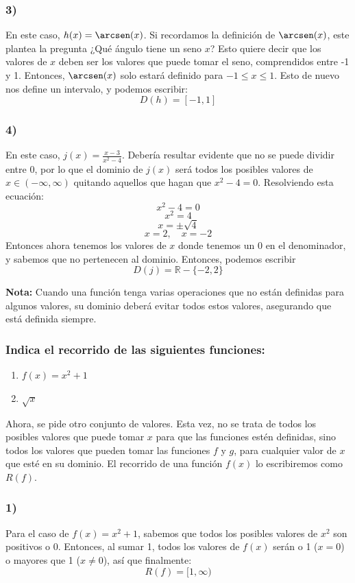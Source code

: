 \documentclass[sans]{apuntes}
\begin{document}
\begin{examplebox}
	\subsubsection*{3)}
	En este caso, $h(x) = \arcsen(x)$. Si recordamos la definición de $\arcsen(x)$, este plantea la pregunta ¿Qué ángulo tiene un seno $x$? Esto quiere decir que los valores de $x$ deben ser los valores que puede tomar el seno, comprendidos entre -1 y 1. Entonces, $\arcsen(x)$ solo estará definido para $-1 \leq x \leq 1$. Esto de nuevo nos define un intervalo, y podemos escribir:
	\[D(h) = [-1, 1]\]

	\subsubsection*{4)}
	En este caso, $j(x) =\frac{x - 3}{x^2 - 4}$. Debería resultar evidente que no se puede dividir entre 0, por lo que el dominio de $j(x)$ será todos los posibles valores de $x \in (-\infty, \infty)$ quitando aquellos que hagan que $x^2 - 4 = 0$. Resolviendo esta ecuación:
	\[x^2 - 4 = 0\]
	\[x^2 = 4\]
	\[x = \pm \sqrt{4}\]
	\[x = 2,\quad x = -2\]
	Entonces ahora tenemos los valores de $x$ donde tenemos un 0 en el denominador, y sabemos que no pertenecen al dominio. Entonces, podemos escribir
	\[D(j) = \mathbb{R} - \{-2, 2\} \]

	\textbf{Nota:} Cuando una función tenga varias operaciones que no están definidas para algunos valores, su dominio deberá evitar todos estos valores, asegurando que está definida siempre.

	\subsubsection*{Indica el recorrido de las siguientes funciones:}
	\begin{enumerate}
		\item $f(x) = x^2 + 1$
		\item $\sqrt{x}$
	\end{enumerate}
	Ahora, se pide otro conjunto de valores. Esta vez, no se trata de todos los posibles valores que puede tomar $x$ para que las funciones estén definidas, sino todos los valores que pueden tomar las funciones $f$ y $g$, para cualquier valor de $x$ que esté en su dominio. El recorrido de una función $f(x)$ lo escribiremos como $R(f)$.

	\subsubsection*{1)}
	Para el caso de $f(x) = x^2 + 1$, sabemos que todos los posibles valores de $x^2$ son positivos o 0. Entonces, al sumar 1, todos los valores de $f(x)$ serán o 1 ($x = 0$) o mayores que 1 ($x \neq 0$), así que finalmente:
	\[ R(f) = [1, \infty) \]


\end{examplebox}
\end{document}
